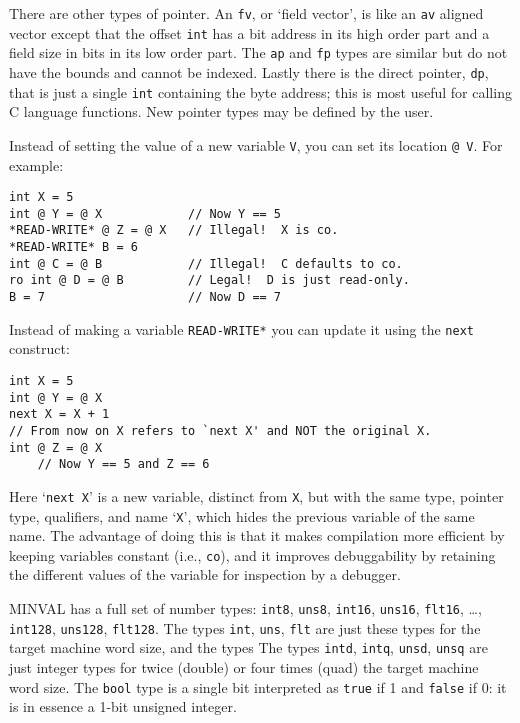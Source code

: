 \documentclass[12pt]{article}
\newenvironment{indpar}[1][0.3in]%
	{\begin{list}{}%
		     {\setlength{\itemsep}{0in}%
		      \setlength{\topsep}{0in}%
		      \setlength{\parsep}{1ex}%
		      \setlength{\labelwidth}{#1}%
		      \setlength{\leftmargin}{#1}%
		      \addtolength{\leftmargin}{\labelsep}}%
	 \item}%
	{\end{list}}
\begin{document}
There are other types of pointer.  An {\tt fv}, or `field vector',
is like an {\tt av} aligned
vector except that the offset {\tt int} has a bit address in its
high order part and a field size in bits in its low order part.
The {\tt ap} and {\tt fp} types are
similar but do not have the bounds and cannot be indexed.  Lastly
there is the direct pointer, {\tt dp}, that is just a single {\tt int}
containing the byte address; this is most useful for calling
C language functions.
New pointer types may be defined by the user.

Instead of setting the value of a new variable {\tt V}, you can 
set its location {\tt @ V}.  For example:
\begin{indpar}\begin{verbatim}
int X = 5
int @ Y = @ X            // Now Y == 5
*READ-WRITE* @ Z = @ X   // Illegal!  X is co.
*READ-WRITE* B = 6
int @ C = @ B            // Illegal!  C defaults to co.
ro int @ D = @ B         // Legal!  D is just read-only.
B = 7                    // Now D == 7
\end{verbatim}\end{indpar}

Instead of making a variable {\tt *READ-WRITE*} you can update
it using the {\tt next} construct:
\begin{indpar}\begin{verbatim}
int X = 5
int @ Y = @ X
next X = X + 1
// From now on X refers to `next X' and NOT the original X.
int @ Z = @ X
    // Now Y == 5 and Z == 6
\end{verbatim}\end{indpar}
Here `{\tt next X}' is a new variable, distinct from {\tt X},
but with the same type, pointer type, qualifiers, and name `{\tt X}',
which hides the previous variable of the same name.
The advantage of doing this is that it makes compilation more
efficient by keeping variables constant (i.e., {\tt co}), and
it improves debuggability by retaining the different values of
the variable for inspection by a debugger.

MINVAL has a full set of number types:
{\tt int8}, {\tt uns8},
{\tt int16}, {\tt uns16}, {\tt flt16}, \ldots,
{\tt int128}, {\tt uns128}, {\tt flt128}.
The types {\tt int}, {\tt uns}, {\tt flt} are just these
types for the target machine word size, and the types
The types {\tt intd}, {\tt intq}, {\tt unsd}, {\tt unsq} are just integer
types for twice (double) or four times (quad) the target machine word size.
The {\tt bool} type is a single bit interpreted as {\tt true} if
1 and {\tt false} if 0: it is in essence a 1-bit unsigned integer.
\end{document}
